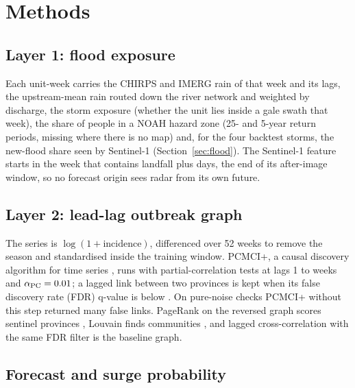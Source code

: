 \section{Methods}
\label{sec:methods}

\subsection{Layer 1: flood exposure}

Each unit-week carries the CHIRPS and IMERG rain of that week and its lags, the upstream-mean rain routed down the river network and weighted by discharge, the storm exposure (whether the unit lies inside a gale swath that week), the share of people in a NOAH hazard zone (25- and 5-year return periods, missing where there is no map) and, for the four backtest storms, the new-flood share seen by Sentinel-1 (Section~\ref{sec:flood}). The Sentinel-1 feature starts in the week that contains landfall plus \sOneAfterDays{} days, the end of its after-image window, so no forecast origin sees radar from its own future.

\subsection{Layer 2: lead-lag outbreak graph}

The series is $\log(1 + \text{incidence})$, differenced over 52 weeks to remove the season and standardised inside the training window. PCMCI+, a causal discovery algorithm for time series \parencite{runge2019, runge2020}, runs with partial-correlation tests at lags 1 to \tauMax{} weeks and $\alpha_{\text{PC}} = 0.01$; a lagged link between two provinces is kept when its false discovery rate (FDR) q-value is below \fdrQ{} \parencite{benjamini1995}. On pure-noise checks PCMCI+ without this step returned many false links. PageRank on the reversed graph scores sentinel provinces \parencite{page1999}, Louvain finds communities \parencite{blondel2008}, and lagged cross-correlation with the same FDR filter is the baseline graph.

\subsection{Forecast and surge probability}

